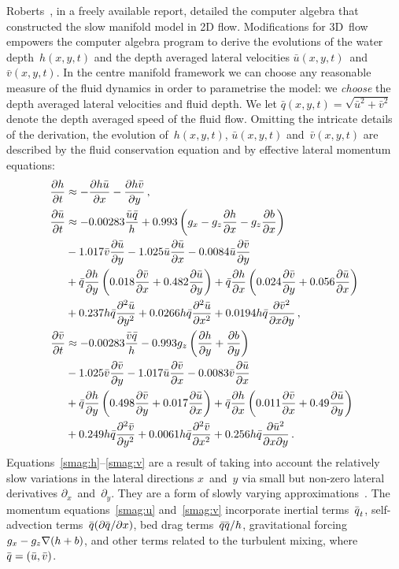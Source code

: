 \documentclass[twocolumn]{afmc_art}
\newcommand{\uu}{{\bar u}}
\newcommand{\vv}{{\bar v}}
\newcommand{\bq}{{\bar q}}
\newcommand{\qq}{{\bar{\vec q}}}
\renewcommand{\vec}[1]{\text{\boldmath$#1$}}
\begin{document}
Roberts~\cite{Roberts:2008fk}, in a freely available report, detailed the computer algebra that constructed the slow manifold model in 2D flow. 
Modifications for 3D~flow empowers the computer algebra program to derive the evolutions of the water depth~$h(x,y,t)$ and the depth averaged lateral velocities $\uu(x,y,t)$~and~$\vv(x,y,t)$. 
In the centre manifold framework we can choose any reasonable measure of the fluid dynamics in order to parametrise the model: we \emph{choose} the depth averaged lateral velocities and fluid depth. 
We let $\bq(x,y,t)=\sqrt{\uu^2+\vv^2}$ denote the depth averaged speed of the fluid flow.
Omitting the intricate details of the derivation, the evolution of~$h(x,y,t)$, $\uu(x,y,t)$ and~$\vv(x,y,t)$ are described by the fluid conservation equation and by effective lateral momentum equations:
\begin{align}
\D{t}{h}&
\approx-\D{x}{h\bar u}-\D{y}{h\bar v}\,,\label{smag:h}
\\
\D{t}{\bar u}&
\approx-0.00283 \frac{\bar u\bq}{h}
+0.993\left(g_x-g_z\D{x}{h}-g_z\D{x}{b}\right)
\nonumber\\&
-1.017\vv\D{y}{\uu}
-1.025\uu\D{x}{\uu}
-0.0084\uu\D{y}{\vv}
\nonumber\\&
+\bq\D yh\left(0.018\D x\vv+0.482\D y\uu\right)
+\bq\D xh\left(0.024\D y\vv+0.056\D x\uu\right)
\nonumber\\&
+0.237h\bq\DD y\uu
+0.0266h\bq\DD x\uu
+0.0194h\bq\frac{\partial\vv^2}{\partial x\partial y}\,,
\label{smag:u}
\\
\D{t}{\bar v}&
\approx-0.00283 \frac{\bar v\bq}{h}
-0.993g_z\left(\D{y}{h}+\D{y}{b}\right)
\nonumber\\&
-1.025\bar v\D{y}{\bar v}
-1.017\bar u\D{x}{\bar v}
-0.0083\vv\D x\uu
\nonumber\\&
+\bq\D yh\left(0.498\D y\vv+0.017\D x\uu\right)
+\bq\D xh\left(0.011\D x\vv+0.49\D y\uu\right)
\nonumber\\&
+0.249h\bq\DD y\vv
+0.0061h\bq\DD x\vv
+0.256h\bq\frac{\partial\uu^2}{\partial x\partial y}
\,.\label{smag:v}
\end{align}
Equations~\eqref{smag:h}--\eqref{smag:v} are a result of taking into account the relatively slow variations in the lateral directions $x$~and~$y$ via small but non-zero lateral derivatives $\partial_x$~and~$\partial_y$.  
They are a form of slowly varying approximations~\cite[e.g.]{Roberts1996}.
The momentum equations~\eqref{smag:u} and~\eqref{smag:v} incorporate inertial terms~$\qq_t$, self-advection terms~$\qq(\D x\qq)$,
bed drag terms~$\bq{\qq}/{h}$, gravitational forcing $g_x-g_z{\grad(h+b)}$, and other terms related to the turbulent mixing, where $\qq=(\uu,\vv)$. 
\end{document}
